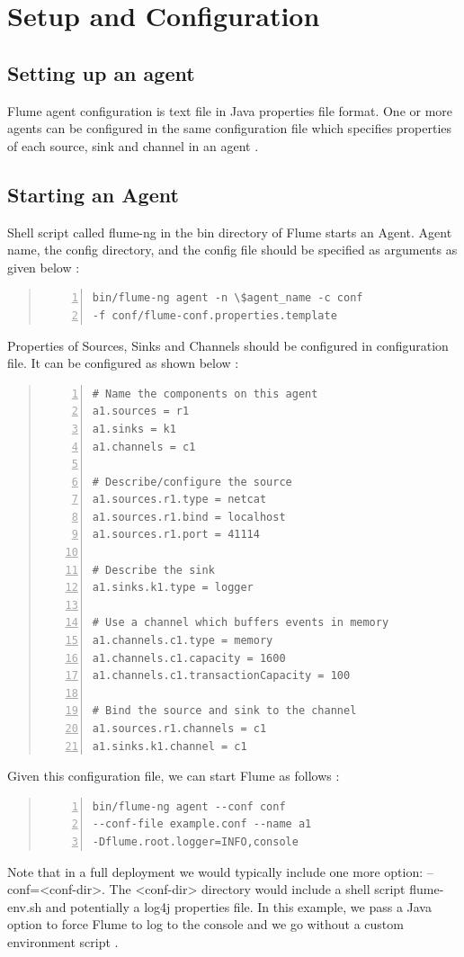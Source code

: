 \documentclass[9pt,twocolumn,twoside]{styles/osajnl}
\begin{document}
\section{Setup and Configuration}
\subsection{Setting up an agent}
Flume agent configuration is text file in Java properties file format. One or more agents can be configured in the same configuration file which specifies properties of each source, sink and channel in an agent \cite{user-manual}.

\subsection{Starting an Agent}
Shell script called flume-ng in the bin directory of Flume starts an Agent. Agent name, the config directory, and the config file should be specified as arguments as given below \cite{user-manual}:

\begin{quote}
\begin{Verbatim}[numbers=left]
bin/flume-ng agent -n \$agent_name -c conf 
-f conf/flume-conf.properties.template
\end{Verbatim}
\end{quote}

Properties of Sources, Sinks and Channels should be configured in configuration file. It can be configured as shown below \cite{user-manual}:
\begin{quote}
\begin{Verbatim}[numbers=left]
# Name the components on this agent
a1.sources = r1
a1.sinks = k1
a1.channels = c1

# Describe/configure the source
a1.sources.r1.type = netcat
a1.sources.r1.bind = localhost
a1.sources.r1.port = 41114

# Describe the sink
a1.sinks.k1.type = logger

# Use a channel which buffers events in memory
a1.channels.c1.type = memory
a1.channels.c1.capacity = 1600
a1.channels.c1.transactionCapacity = 100

# Bind the source and sink to the channel
a1.sources.r1.channels = c1
a1.sinks.k1.channel = c1\end{Verbatim}
\end{quote}

Given this configuration file, we can start Flume as follows \cite{user-manual}:
\begin{quote}
\begin{Verbatim}[numbers=left]
bin/flume-ng agent --conf conf 
--conf-file example.conf --name a1 
-Dflume.root.logger=INFO,console
\end{Verbatim}
\end{quote}
Note that in a full deployment we would typically include one more option: --conf=<conf-dir>. The <conf-dir> directory would include a shell script flume-env.sh and potentially a log4j properties file. In this example, we pass a Java option to force Flume to log to the console and we go without a custom environment script \cite{user-manual}.
\end{document}
